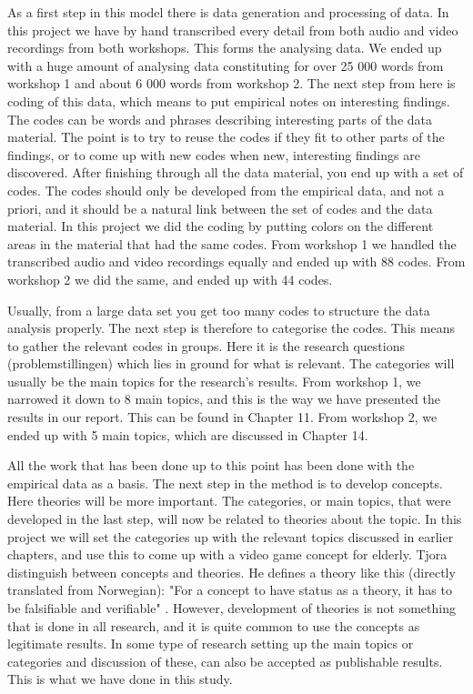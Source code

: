 As a first step in this model there is data generation and processing of data. In this project we have by hand transcribed every detail from both audio and video recordings from both workshops. This forms the analysing data. We ended up with a huge amount of analysing data constituting for over 25 000 words from workshop 1 and about 6 000 words from workshop 2. The next step from here is coding of this data, which means to put empirical notes on interesting findings. The codes can be words and phrases describing interesting parts of the data material. The point is to try to reuse the codes if they fit to other parts of the findings, or to come up with new codes when new, interesting findings are discovered. After finishing through all the data material, you end up with a set of codes. The codes should only be developed from the empirical data, and not a priori, and it should be a natural link between the set of codes and the data material. In this project we did the coding by putting colors on the different areas in the material that had the same codes. From workshop 1 we handled the transcribed audio and video recordings equally and ended up with 88 codes. From workshop 2 we did the same, and ended up with 44 codes.

Usually, from a large data set you get too many codes to structure the data analysis properly. The next step is therefore to categorise the codes. This means to gather the relevant codes in groups. Here it is the research questions (problemstillingen) which lies in ground for what is relevant. The categories will usually be the main topics for the research's results. From workshop 1, we narrowed it down to 8 main topics, and this is the way we have presented the results in our report. This can be found in Chapter 11. From workshop 2, we ended up with 5 main topics, which are discussed in Chapter 14.

All the work that has been done up to this point has been done with the empirical data as a basis. The next step in the method is to develop concepts. Here theories will be more important. The categories, or main topics, that were developed in the last step, will now be related to theories about the topic. In this project we will set the categories up with the relevant topics discussed in earlier chapters, and use this to come up with a video game concept for elderly. Tjora \cite{tjora} distinguish between concepts and theories. He defines a theory like this (directly translated from Norwegian): "For a concept to have status as a theory, it has to be falsifiable and verifiable" \cite{tjora}. However, development of theories is not something that is done in all research, and it is quite common to use the concepts as legitimate results. In some type of research setting up the main topics or categories and discussion of these, can also be accepted as publishable results. This is what we have done in this study. 

